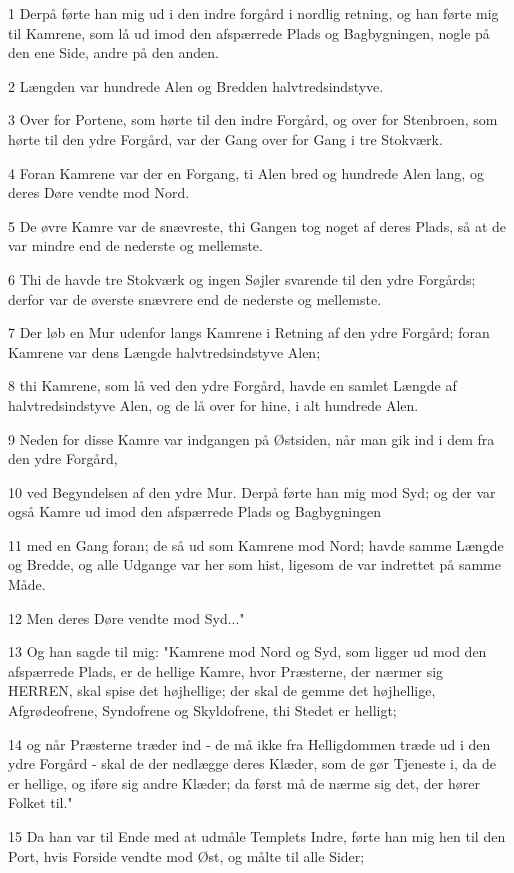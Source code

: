 \par 1 Derpå førte han mig ud i den indre forgård i nordlig retning, og han førte mig til Kamrene, som lå ud imod den afspærrede Plads og Bagbygningen, nogle på den ene Side, andre på den anden.
\par 2 Længden var hundrede Alen og Bredden halvtredsindstyve.
\par 3 Over for Portene, som hørte til den indre Forgård, og over for Stenbroen, som hørte til den ydre Forgård, var der Gang over for Gang i tre Stokværk.
\par 4 Foran Kamrene var der en Forgang, ti Alen bred og hundrede Alen lang, og deres Døre vendte mod Nord.
\par 5 De øvre Kamre var de snævreste, thi Gangen tog noget af deres Plads, så at de var mindre end de nederste og mellemste.
\par 6 Thi de havde tre Stokværk og ingen Søjler svarende til den ydre Forgårds; derfor var de øverste snævrere end de nederste og mellemste.
\par 7 Der løb en Mur udenfor langs Kamrene i Retning af den ydre Forgård; foran Kamrene var dens Længde halvtredsindstyve Alen;
\par 8 thi Kamrene, som lå ved den ydre Forgård, havde en samlet Længde af halvtredsindstyve Alen, og de lå over for hine, i alt hundrede Alen.
\par 9 Neden for disse Kamre var indgangen på Østsiden, når man gik ind i dem fra den ydre Forgård,
\par 10 ved Begyndelsen af den ydre Mur. Derpå førte han mig mod Syd; og der var også Kamre ud imod den afspærrede Plads og Bagbygningen
\par 11 med en Gang foran; de så ud som Kamrene mod Nord; havde samme Længde og Bredde, og alle Udgange var her som hist, ligesom de var indrettet på samme Måde.
\par 12 Men deres Døre vendte mod Syd..."
\par 13 Og han sagde til mig: "Kamrene mod Nord og Syd, som ligger ud mod den afspærrede Plads, er de hellige Kamre, hvor Præsterne, der nærmer sig HERREN, skal spise det højhellige; der skal de gemme det højhellige, Afgrødeofrene, Syndofrene og Skyldofrene, thi Stedet er helligt;
\par 14 og når Præsterne træder ind - de må ikke fra Helligdommen træde ud i den ydre Forgård - skal de der nedlægge deres Klæder, som de gør Tjeneste i, da de er hellige, og iføre sig andre Klæder; da først må de nærme sig det, der hører Folket til."
\par 15 Da han var til Ende med at udmåle Templets Indre, førte han mig hen til den Port, hvis Forside vendte mod Øst, og målte til alle Sider;
